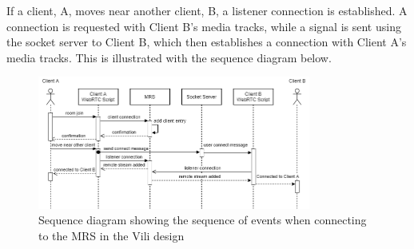 If a client, A, moves near another client, B,  a listener connection is established. A connection is requested with Client B's media tracks, while a signal is sent using the socket server to Client B, which then establishes a connection with Client A's media tracks. This is illustrated with the sequence diagram below.
\begin{figure}[H]
    \centering
    \includegraphics[width=0.8\textwidth]{Pictures/Sleipnir Configuration.png}
    \caption{Sequence diagram showing the sequence of events when connecting to the MRS in the Vili design}
    \label{fig:gantt}
\end{figure}